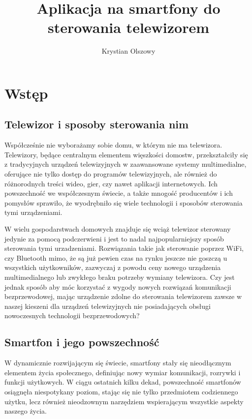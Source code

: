 \documentclass[12pt,twoside]{article}
\author{Krystian Olszowy}
\title{Aplikacja na smartfony do sterowania telewizorem}
\begin{document}
\maketitle

\blankpage

\tableofcontents

\clearpage
\blankpage

\section{Wstęp}
\subsection{Telewizor i sposoby sterowania nim}
Współcześnie nie wyborażamy sobie domu, w którym nie ma telewizora. Telewizory, będące
centralnym elementem więszkości domostw, przekształciły się z tradycyjnych urządzeń
telewizyjnych w zaawansowane systemy multimedialne, oferujące nie tylko dostęp do programów telewizyjnych,
ale również do różnorodnych treści wideo, gier, czy nawet aplikacji internetowych.
Ich powszechność we współczesnym świecie, a także mnogość producentów i ich pomysłów
sprawiło, że wyodrębniło się wiele technologii i sposobów sterowania tymi urządzeniami.

W wielu gospodarstwach domowych znajduje się wciąż telewizor sterowany jedynie za pomocą podczerwieni i jest
to nadal najpopularniejszy sposób sterowania tymi urzadzeniami. Rozwiązania takie jak sterowanie poprzez WiFi, czy Bluetooth
mimo, że są już pewien czas na rynku jeszcze nie goszczą u wszystkich użytkowników, zazwyczaj z powodu ceny
nowego urządzenia multimedialnego lub zwykłego braku potrzeby wymiany telewizora. Czy jest jednak sposób aby
móc korzystać z wygody nowych rozwiązań komunikacji bezprzewodowej, mając urządzenie zdolne do sterowania
telewizorem zawsze w naszej kieszeni dla urządzeń telewizyjnych nie posiadających obsługi nowoczesnych technologii bezprzewodowych?

\subsection{Smartfon i jego powszechność}
W dynamicznie rozwijającym się świecie, smartfony stały się nieodłącznym elementem życia społecznego,
definiując nowy wymiar komunikacji, rozrywki i funkcji użytkowych.
W ciągu ostatnich kilku dekad, powszechność smartfonów osiągnęła niespotykany poziom,
stając się nie tylko przedmiotem codziennego użytku, lecz również nieodzownym
narzędziem wspierającym wszystkie aspekty naszego życia.
\end{document}

